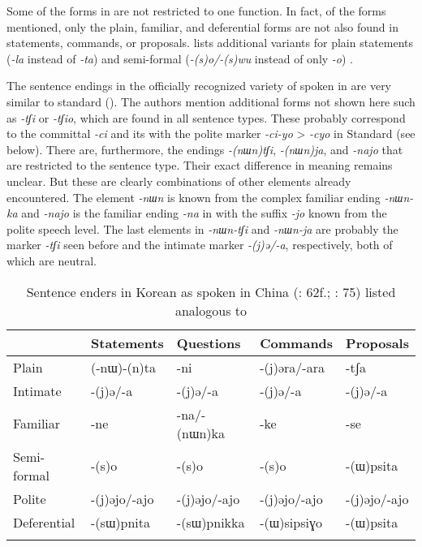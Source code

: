 Some of the forms in  are not restricted to one function. In fact, of the  forms mentioned, only the plain, familiar, and deferential forms are not also found in statements, commands, or proposals. \citet[449]{Sohn2015} lists additional variants for plain statements (\textit{-la} instead of \textit{-ta}) and semi-formal (\textit{-(s)o/-(s)wu} instead of only \textit{-o}) .

The sentence endings in the officially recognized variety of  spoken in  are very similar to standard  (). The authors mention additional forms not shown here such as \textit{-tʃi} or \textit{-tʃio}, which are found in all sentence types. These probably correspond to the committal \textit{-ci} and its  with the polite marker \textit{-ci-yo} > \textit{-cyo} in Standard  (see below). There are, furthermore, the endings \textit{-(nɯn)tʃi}, \textit{-(nɯn)ja}, and \textit{-najo} that are restricted to the  sentence type. Their exact difference in meaning remains unclear. But these are clearly combinations of other elements already encountered. The element \textit{-nɯn} is known from the complex familiar  ending \textit{-nɯn-ka} and \textit{-najo} is the familiar  ending \textit{-na} in  with the suffix \textit{-jo} known from the polite speech level. The last elements in \textit{-nɯn-tʃi} and \textit{-nɯn-ja} are probably the marker \textit{-tʃi} seen before and the intimate marker \textit{-(j)ə/-a}, respectively, both of which are  neutral.

\begin{table}
\caption{Sentence enders in Korean as spoken in China (\citealt{XuanDewu1985}: 62f.; \citealt{ZhaoXi1982}: 75) listed analogous to }
\label{tab:kore:2}

\begin{tabularx}{\textwidth}{XXXXl}
\lsptoprule
& \textbf{Statements} & \textbf{Questions} & \textbf{Commands} & \textbf{Proposals}\\
\midrule
Plain & (-nɯ)-(n)ta & -ni & -(j)əra/-ara & -tʃa\\
Intimate & -(j)ə/-a & -(j)ə/-a & -(j)ə/-a & -(j)ə/-a\\
Familiar & -ne & -na/-(nɯn)ka & -ke & -se\\
Semi-formal & -(s)o & -(s)o & -(s)o & -(ɯ)psita\\
Polite & -(j)əjo/-ajo & -(j)əjo/-ajo & -(j)əjo/-ajo & -(j)əjo/-ajo\\
Deferential & -(sɯ)pnita & -(sɯ)pnikka & -(ɯ)sipsiɣo & -(ɯ)psita\\
\lspbottomrule
\end{tabularx}
\end{table}

